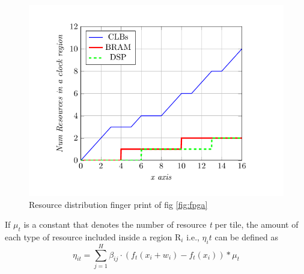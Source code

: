 \begin{figure}
  \includegraphics[width=\linewidth]{graphics/resource.png}
  \caption{Resource distribution finger print of fig \ref{fig:fpga}}
  \label{fig:finger-print}
\end{figure}

If $\mu_t$ is a constant that denotes the number of resource \textit{t} per tile, the amount of each type of resource included inside a region R$_i$ i.e., $\eta_it$ can be defined as \\

\begin{equation}
\label{model:eq:4}
\eta_{it} = \sum_{j=1}^{H} \beta_{ij} \cdot (f_t(x_i+w_i) - f_t(x_i)) * \mu_t
\end{equation}

